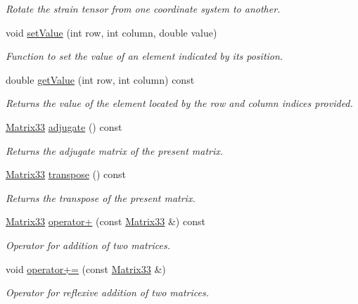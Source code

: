\begin{DoxyCompactItemize}
\begin{DoxyCompactList}\small\item\em \-Rotate the strain tensor from one coordinate system to another. \end{DoxyCompactList}\item 
void \hyperlink{classMatrix33_a6cdcec77fd089b2e73ad7ae85ecff30b}{set\-Value} (int row, int column, double value)
\begin{DoxyCompactList}\small\item\em \-Function to set the value of an element indicated by its position. \end{DoxyCompactList}\item 
double \hyperlink{classMatrix33_ab53b3e37ad830a87a804cf26311ba088}{get\-Value} (int row, int column) const 
\begin{DoxyCompactList}\small\item\em \-Returns the value of the element located by the row and column indices provided. \end{DoxyCompactList}\item 
\hyperlink{classMatrix33}{\-Matrix33} \hyperlink{classMatrix33_a07b999a7b1c905f3c98ba3792e6fa33f}{adjugate} () const 
\begin{DoxyCompactList}\small\item\em \-Returns the adjugate matrix of the present matrix. \end{DoxyCompactList}\item 
\hyperlink{classMatrix33}{\-Matrix33} \hyperlink{classMatrix33_a64418c1a8836b38526fdfd7ffcc79cfd}{transpose} () const 
\begin{DoxyCompactList}\small\item\em \-Returns the transpose of the present matrix. \end{DoxyCompactList}\item 
\hyperlink{classMatrix33}{\-Matrix33} \hyperlink{classMatrix33_adc58ec5739c9250ff1150c725d0e868e}{operator+} (const \hyperlink{classMatrix33}{\-Matrix33} \&) const 
\begin{DoxyCompactList}\small\item\em \-Operator for addition of two matrices. \end{DoxyCompactList}\item 
void \hyperlink{classMatrix33_acb59e59d3937e075521f478ba83b7165}{operator+=} (const \hyperlink{classMatrix33}{\-Matrix33} \&)
\begin{DoxyCompactList}\small\item\em \-Operator for reflexive addition of two matrices. \end{DoxyCompactList}\item 

\end{DoxyCompactItemize}
